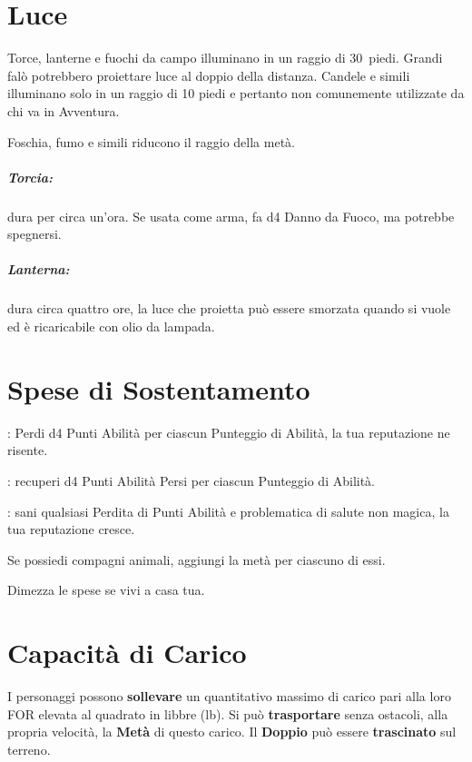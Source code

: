 \documentclass[itdr]{subfiles}
\begin{document}
\vfill

\section{Luce}

Torce, lanterne e fuochi da campo illuminano in un raggio di \mbox{30 piedi}. Grandi falò potrebbero proiettare luce al doppio della distanza. Candele e simili illuminano solo in un raggio di 10 piedi e pertanto non comunemente utilizzate da chi va in Avventura.

Foschia, fumo e simili riducono il raggio della metà.

\subparagraph{Torcia:} dura per circa un'ora. Se usata come arma, fa d4 Danno da Fuoco, ma potrebbe spegnersi.

\subparagraph{Lanterna:} dura circa quattro ore, la luce che proietta può essere smorzata quando si vuole ed è ricaricabile con olio da lampada.

\vfill

\section{Spese di Sostentamento}

:
Perdi d4 Punti Abilità per ciascun Punteggio di Abilità, la tua reputazione ne risente.

:
recuperi d4 Punti Abilità Persi per ciascun Punteggio di Abilità.

:
sani qualsiasi Perdita di Punti Abilità e problematica di salute non magica, la tua reputazione cresce.

Se possiedi compagni animali, aggiungi la metà per ciascuno di essi.

Dimezza le spese se vivi a casa tua.

\vfill

\section{Capacità di Carico}

I personaggi possono \textbf{sollevare} un quantitativo massimo di carico pari alla loro FOR elevata al quadrato in libbre (lb). Si può \textbf{trasportare} senza ostacoli, alla propria velocità, la \textbf{Metà} di questo carico. Il \textbf{Doppio} può essere \textbf{trascinato} sul terreno.
\end{document}
